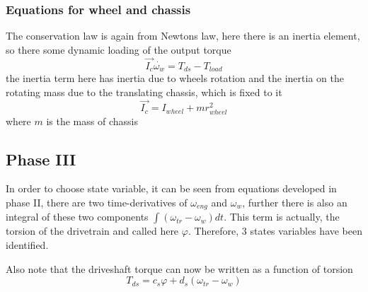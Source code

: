 \subsubsection{Equations for wheel and chassis}

The conservation law is again from Newtons law, here there is an inertia element, so there some dynamic loading of the output torque
\begin{equation}
	\vec{I_c}\dot{\omega_{w}} = T_{ds} - T_{load}
\end{equation}
the inertia term here has inertia due to wheels rotation and the inertia on the rotating mass due to the translating chassis, which is fixed to it
\begin{equation}
	\vec{I_c} = I_{wheel} + m r^{2}_{wheel}
\end{equation}
where $m$ is the mass of chassis

\subsection{Phase III}

In order to choose state variable, it can be seen from equations developed in phase II, there are two time-derivatives of $\omega_{eng}$ and $\omega_{w}$, further there is also an integral of these two components $\int (\omega_{tr} - \omega_{w}) dt$. This term is actually, the torsion of the drivetrain and called here $\varphi$. Therefore, 3 states variables have been identified.

Also note that the driveshaft torque can now be written as a function of torsion
\begin{equation}
	T_{ds} = c_s \varphi + d_s (\omega_{tr} - \omega_{w})
\end{equation}

